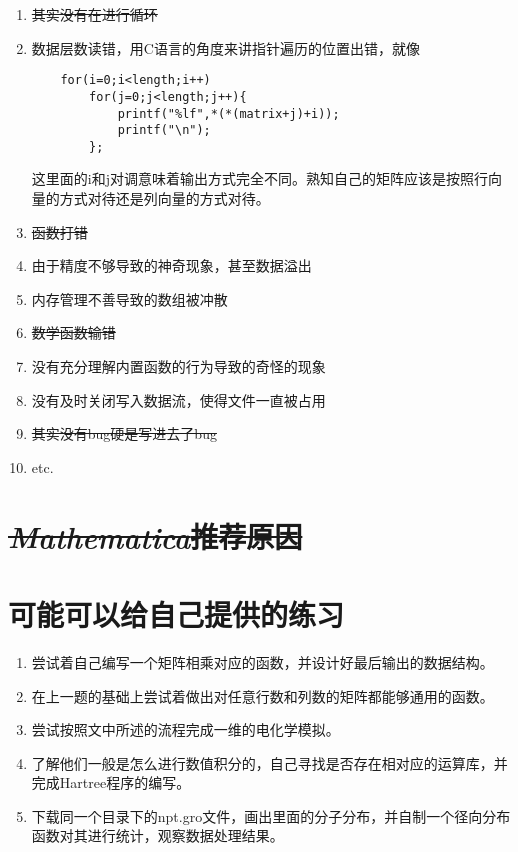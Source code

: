 \documentclass[12pt,a4paper]{article}
\begin{document}
\begin{enumerate}
	\item \sout{其实没有在进行循环}
	\item 数据层数读错，用C语言的角度来讲指针遍历的位置出错，就像
	\begin{lstlisting}
	for(i=0;i<length;i++)
		for(j=0;j<length;j++){
			printf("%lf",*(*(matrix+j)+i));
			printf("\n");
		};
	\end{lstlisting}
	这里面的i和j对调意味着输出方式完全不同。熟知自己的矩阵应该是按照行向量的方式对待还是列向量的方式对待。

	\item \sout{函数打错}
	\item 由于精度不够导致的神奇现象，甚至数据溢出
	\item 内存管理不善导致的数组被冲散
	\item \sout{数学函数输错}
	\item 没有充分理解内置函数的行为导致的奇怪的现象
	\item 没有及时关闭写入数据流，使得文件一直被占用
	\item \sout{其实没有bug硬是写进去了bug}
	\item etc.
\end{enumerate}

\section*{\sout{\emph{Mathematica}推荐原因}}


\section{可能可以给自己提供的练习}
\begin{enumerate}
	\item 尝试着自己编写一个矩阵相乘对应的函数，并设计好最后输出的数据结构。
	\item 在上一题的基础上尝试着做出对任意行数和列数的矩阵都能够通用的函数。
	\item 尝试按照文中所述的流程完成一维的电化学模拟。
	\item 了解他们一般是怎么进行数值积分的，自己寻找是否存在相对应的运算库，并完成Hartree程序的编写。
	\item 下载同一个目录下的npt.gro文件，画出里面的分子分布，并自制一个径向分布函数对其进行统计，观察数据处理结果。
	\end{enumerate}
\end{document}
